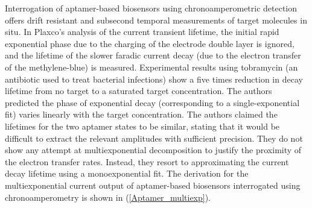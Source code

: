 Interrogation of aptamer-based biosensors using chronoamperometric detection offers drift resistant and subsecond temporal measurements of target molecules in situ. In Plaxco's analysis of the current transient lifetime, the initial rapid exponential phase due to the charging of the electrode double layer is ignored, and the lifetime of the slower faradic current decay (due to the electron transfer of the methylene-blue) is measured. Experimental results using tobramycin (an antibiotic used to treat bacterial infections) show a five times reduction in decay lifetime from no target to a saturated target concentration. The authors predicted the phase of exponential decay (corresponding to a single-exponential fit) varies linearly with the target concentration. The authors claimed the lifetimes for the two aptamer states to be similar, stating that it would be difficult to extract the relevant amplitudes with sufficient precision. They do not show any attempt at multiexponential decomposition to justify the proximity of the electron transfer rates. Instead, they resort to approximating the current decay lifetime using a monoexponential fit. The derivation for the multiexponential current output of aptamer-based biosensors interrogated using chronoamperometry is shown in (\autoref{Aptamer_multiexp}).\\\\
